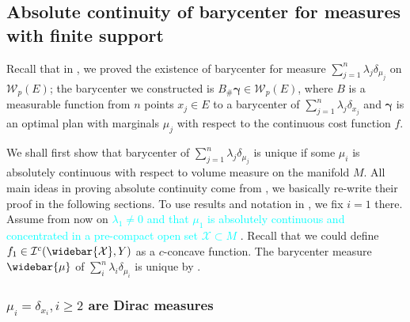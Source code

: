 \subsection{Absolute continuity of barycenter for measures with finite support}

\label{section:absolute_continuity_finite_support}
Recall that in ,
we proved the existence of barycenter for measure $\sum_{j=1}^{n} \lambda_j \delta_{\mu_j}$ on $\mathcal{W}_p(E)$;
the barycenter we constructed is $B_{\#}\boldsymbol{\gamma} \in \mathcal{W}_p(E)$,
where $B$ is a measurable function from $n$ points $x_j \in E$ to a barycenter of
$\sum_{j=1}^{n} \lambda_j \delta_{x_j}$
and $\boldsymbol{\gamma}$ is an optimal plan with marginals $\mu_j$ with respect to the continuous cost function $f$.

We shall first show that barycenter of $\sum_{j=1}^n \lambda_j \delta_{\mu_j}$
is unique if some $\mu_i$
is absolutely continuous with respect to volume measure on the manifold $M$.
All main ideas in proving absolute continuity come from \cite{KIM2017640},
we basically re-write their proof in the following sections.
To use results and notation in ,
we fix $i = 1$ there.
Assume from now on \textcolor{cyan}{
	$ \lambda_1 \neq 0$ and that $\mu_1$ is absolutely continuous and
	concentrated in a pre-compact open set $ \mathcal{X} \subset M $
}.
Recall that we could define $f_1 \in \mathcal{I}^c( \widebar{ \mathcal{X} }, Y)$
as a $c$-concave function.
The barycenter measure $\widebar{\mu}$ of $\sum_{i}^{n} \lambda_{i} \delta_{\mu_i}$ is unique by .
\subsubsection{$\mu_i = \delta_{x_i}, i \geq 2$ are Dirac measures}

